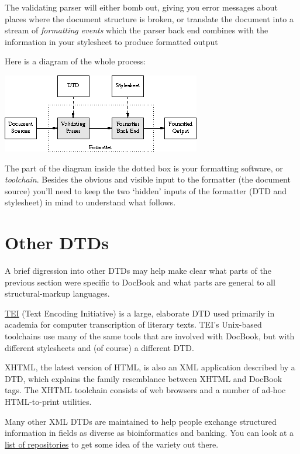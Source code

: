 \documentclass[pdftex,english,a4paper,10pt]{infocom}
\begin{document}
The validating parser will either bomb out, giving you error
messages about places where the document structure is broken, or translate
the document into a stream of {\em formatting events}
which the parser back end combines with the information in your stylesheet
to produce formatted output

Here is a diagram of the whole process:

{{\includegraphics[]{figure1.png}}}

The part of the diagram inside the dotted box is your formatting
software, or {\em toolchain}. Besides the obvious and
visible input to the formatter (the document source) you'll need to
keep the two `hidden' inputs of the formatter (DTD and stylesheet) in
mind to understand what follows.

\section{Other DTDs}
\label{id176297}\hypertarget{id176297}{}%

A brief digression into other DTDs may help make clear what parts of
the previous section were specific to DocBook and what parts are general to
all structural-markup languages.

\href{http://www.tei-c.org/}{TEI} (Text Encoding
Initiative) is a large, elaborate DTD used primarily in academia for
computer transcription of literary texts.  TEI's Unix-based toolchains
use many of the same tools that are involved with DocBook, but with
different stylesheets and (of course) a different DTD.

XHTML, the latest version of HTML, is also an XML application
described by a DTD, which explains the family resemblance between
XHTML and DocBook tags. The XHTML toolchain consists of web browsers
and a number of ad-hoc HTML-to-print utilities.

Many other XML DTDs are maintained to help people exchange
structured information in fields as diverse as bioinformatics and
banking.  You can look at a \href{http://www.xml.com/pub/rg/DTD_Repositories}{ list of
repositories} to get some idea of the variety out
there.
\end{document}
